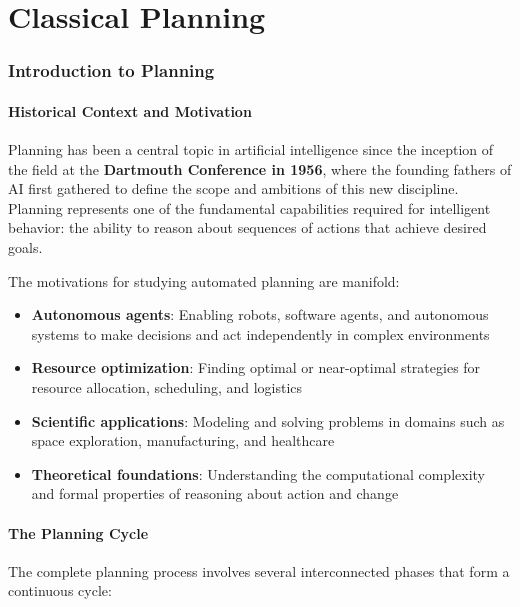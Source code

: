 \documentclass[11pt,a4paper]{article}
\theoremstyle{definition}
\theoremstyle{plain}
\theoremstyle{remark}
\begin{document}
\newpage
\tableofcontents
\newpage

\part{Classical Planning}

\section{Introduction to Planning}

\subsection{Historical Context and Motivation}

Planning has been a central topic in artificial intelligence since the inception of the field at the \textbf{Dartmouth Conference in 1956}, where the founding fathers of AI first gathered to define the scope and ambitions of this new discipline. Planning represents one of the fundamental capabilities required for intelligent behavior: the ability to reason about sequences of actions that achieve desired goals.

The motivations for studying automated planning are manifold:

\begin{itemize}
    \item \textbf{Autonomous agents}: Enabling robots, software agents, and autonomous systems to make decisions and act independently in complex environments
    \item \textbf{Resource optimization}: Finding optimal or near-optimal strategies for resource allocation, scheduling, and logistics
    \item \textbf{Scientific applications}: Modeling and solving problems in domains such as space exploration, manufacturing, and healthcare
    \item \textbf{Theoretical foundations}: Understanding the computational complexity and formal properties of reasoning about action and change
\end{itemize}

\subsection{The Planning Cycle}

The complete planning process involves several interconnected phases that form a continuous cycle:
\end{document}
